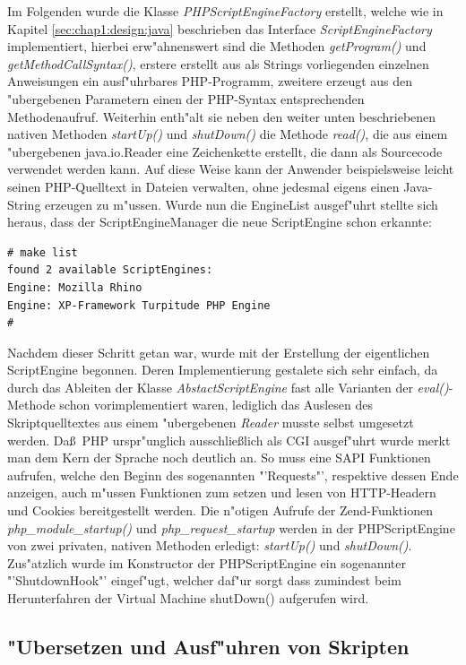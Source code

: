Im Folgenden wurde die Klasse \emph{PHPScriptEngineFactory} erstellt, welche wie in Kapitel
\ref{sec:chap1:design:java} beschrieben
das Interface \emph{ScriptEngineFactory} implementiert, hierbei erw"ahnenswert sind die Methoden 
\emph{getProgram()} und \emph{getMethodCallSyntax()}, erstere erstellt aus als Strings vorliegenden
einzelnen Anweisungen ein ausf"uhrbares PHP-Programm, zweitere erzeugt aus den "ubergebenen Parametern
einen der PHP-Syntax entsprechenden Methodenaufruf. Weiterhin enth"alt sie neben den weiter unten
beschriebenen nativen Methoden \emph{startUp()} und \emph{shutDown()} die Methode \emph{read()}, die
aus einem "ubergebenen java.io.Reader eine Zeichenkette erstellt, die dann als Sourcecode verwendet
werden kann. Auf diese Weise kann der Anwender beispielsweise leicht seinen PHP-Quelltext in Dateien
verwalten, ohne jedesmal eigens einen Java-String erzeugen zu m"ussen.
Wurde nun die EngineList ausgef"uhrt stellte sich heraus, dass der ScriptEngineManager die neue ScriptEngine schon erkannte:
\begin{lstlisting}[caption=Neue ScriptEngine]
# make list
found 2 available ScriptEngines:
Engine: Mozilla Rhino
Engine: XP-Framework Turpitude PHP Engine
#
\end{lstlisting}

Nachdem dieser Schritt getan war, wurde mit der Erstellung der eigentlichen ScriptEngine begonnen. Deren
Implementierung gestalete sich sehr einfach, da durch das Ableiten der Klasse \emph{AbstactScriptEngine} 
fast alle Varianten der \emph{eval()}-Methode schon vorimplementiert waren, lediglich das Auslesen des
Skriptquelltextes aus einem "ubergebenen \emph{Reader} musste selbst umgesetzt werden. 
Da\ss\ PHP urspr"unglich ausschlie\ss lich als CGI ausgef"uhrt wurde merkt man dem Kern der Sprache noch
deutlich an. So muss eine SAPI Funktionen aufrufen, welche den Beginn des sogenannten "'Requests"', respektive
dessen Ende anzeigen, auch m"ussen Funktionen zum setzen und lesen von HTTP-Headern und Cookies bereitgestellt
werden. Die n"otigen Aufrufe der Zend-Funktionen \emph{php\_module\_startup()} und \emph{php\_request\_startup}
werden in der PHPScriptEngine von zwei privaten, nativen Methoden erledigt: \emph{startUp()} und \emph{shutDown()}. 
Zus"atzlich wurde im Konstructor der PHPScriptEngine ein sogenannter "'ShutdownHook"' eingef"ugt, welcher daf"ur 
sorgt dass zumindest beim Herunterfahren der Virtual Machine shutDown() aufgerufen wird.

\subsection{"Ubersetzen und Ausf"uhren von Skripten}
\label{sec:chap1:impl:2}

